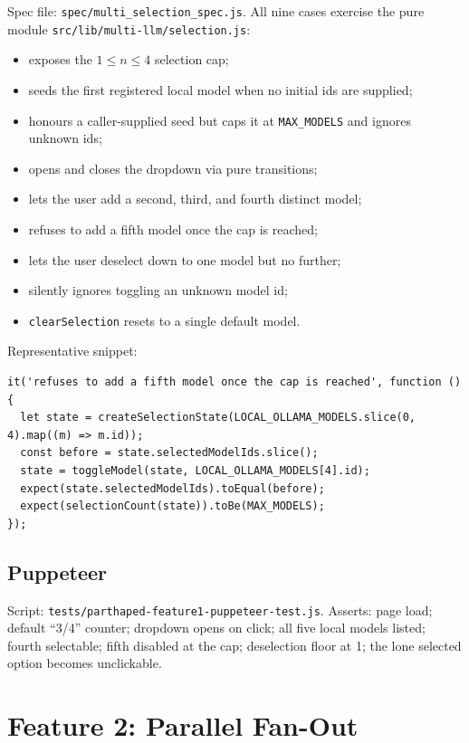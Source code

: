 \documentclass[11pt]{article}
\begin{document}
Spec file: \texttt{spec/multi\_selection\_spec.js}.  All nine cases
exercise the pure module
\texttt{src/lib/multi-llm/selection.js}:

\begin{itemize}[leftmargin=*]
  \item exposes the \(1\le n \le 4\) selection cap;
  \item seeds the first registered local model when no initial ids
    are supplied;
  \item honours a caller-supplied seed but caps it at
    \texttt{MAX\_MODELS} and ignores unknown ids;
  \item opens and closes the dropdown via pure transitions;
  \item lets the user add a second, third, and fourth distinct model;
  \item refuses to add a fifth model once the cap is reached;
  \item lets the user deselect down to one model but no further;
  \item silently ignores toggling an unknown model id;
  \item \texttt{clearSelection} resets to a single default model.
\end{itemize}

Representative snippet:

\begin{lstlisting}
it('refuses to add a fifth model once the cap is reached', function () {
  let state = createSelectionState(LOCAL_OLLAMA_MODELS.slice(0, 4).map((m) => m.id));
  const before = state.selectedModelIds.slice();
  state = toggleModel(state, LOCAL_OLLAMA_MODELS[4].id);
  expect(state.selectedModelIds).toEqual(before);
  expect(selectionCount(state)).toBe(MAX_MODELS);
});
\end{lstlisting}

\subsection{Puppeteer}

Script: \texttt{tests/parthaped-feature1-puppeteer-test.js}.
Asserts: page load; default ``3/4'' counter; dropdown opens on click;
all five local models listed; fourth selectable; fifth disabled at
the cap; deselection floor at 1; the lone selected option becomes
unclickable.

\section{Feature 2: Parallel Fan-Out}
\end{document}
